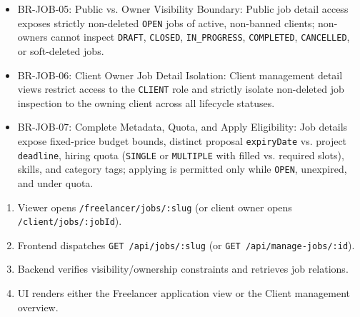 \begin{itemize}[leftmargin=1.6em,topsep=3pt,itemsep=2pt,parsep=0pt,label=$\bullet$]\brrulelist
    \item BR-JOB-05: Public vs. Owner Visibility Boundary: Public job detail access exposes strictly non-deleted \texttt{OPEN} jobs of active, non-banned clients; non-owners cannot inspect \texttt{DRAFT}, \texttt{CLOSED}, \texttt{IN\_PROGRESS}, \texttt{COMPLETED}, \texttt{CANCELLED}, or soft-deleted jobs.
    \item BR-JOB-06: Client Owner Job Detail Isolation: Client management detail views restrict access to the \texttt{CLIENT} role and strictly isolate non-deleted job inspection to the owning client across all lifecycle statuses.
    \item BR-JOB-07: Complete Metadata, Quota, and Apply Eligibility: Job details expose fixed-price budget bounds, distinct proposal \texttt{expiryDate} vs. project \texttt{deadline}, hiring quota (\texttt{SINGLE} or \texttt{MULTIPLE} with filled vs. required slots), skills, and category tags; applying is permitted only while \texttt{OPEN}, unexpired, and under quota.
\end{itemize}

\begin{enumerate}[leftmargin=1.8em,topsep=3pt,itemsep=2pt,parsep=0pt]
    \item Viewer opens \texttt{/freelancer/jobs/:slug} (or client owner opens \texttt{/client/jobs/:jobId}).
    \item Frontend dispatches \texttt{GET /api/jobs/:slug} (or \texttt{GET /api/manage-jobs/:id}).
    \item Backend verifies visibility/ownership constraints and retrieves job relations.
    \item UI renders either the Freelancer application view or the Client management overview.
\end{enumerate}

